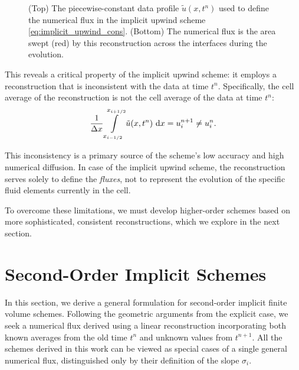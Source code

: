 \begin{figure}[ht]
    \centering

    \begin{subfigure}[b]{\textwidth}
        \centering
        
    \end{subfigure}

    \vspace{1cm}
    
    \begin{subfigure}[b]{\textwidth}
        \centering
        
    \end{subfigure}

    \caption{(Top) The piecewise-constant data profile \(\tilde{u}(x,t^n)\) used to define the numerical flux in the implicit upwind scheme \eqref{eq:implicit_upwind_cons}.
    (Bottom) The numerical flux is the area swept (red) by this reconstruction across the interfaces during the evolution.}
    \label{fig:implicit_upwind_flux}
\end{figure}

This reveals a critical property of the implicit upwind scheme: it employs a reconstruction that is inconsistent with the data at time \(t^n\).
Specifically, the cell average of the reconstruction is not the cell average of the data at time \(t^n\):
\[
    \frac{1}{\Delta x}\int\limits_{{x_{i-1/2}}}^{{x_{i+1/2}}} {\tilde{u}(x,t^n)} \,\operatorname{d}\! x = u_{i}^{n+1} \neq u_{i}^{n}.
\]

This inconsistency is a primary source of the scheme's low accuracy and high numerical diffusion.
In case of the implicit upwind scheme, the reconstruction serves solely to define the \textit{fluxes}, not to represent the evolution of the specific fluid elements currently in the cell.

To overcome these limitations, we must develop higher-order schemes based on more sophisticated, consistent reconstructions, which we explore in the next section.

\section{Second-Order Implicit Schemes}%
\label{sec:second_order_implicit}

In this section, we derive a general formulation for second-order implicit finite volume schemes.
Following the geometric arguments from the explicit case, we seek a numerical flux derived using a linear reconstruction incorporating both known averages from the old time \(t^n\) and unknown values from \(t^{n+1}\).
All the schemes derived in this work can be viewed as special cases of a single general numerical flux, distinguished only by their definition of the slope \(\sigma_i\).

